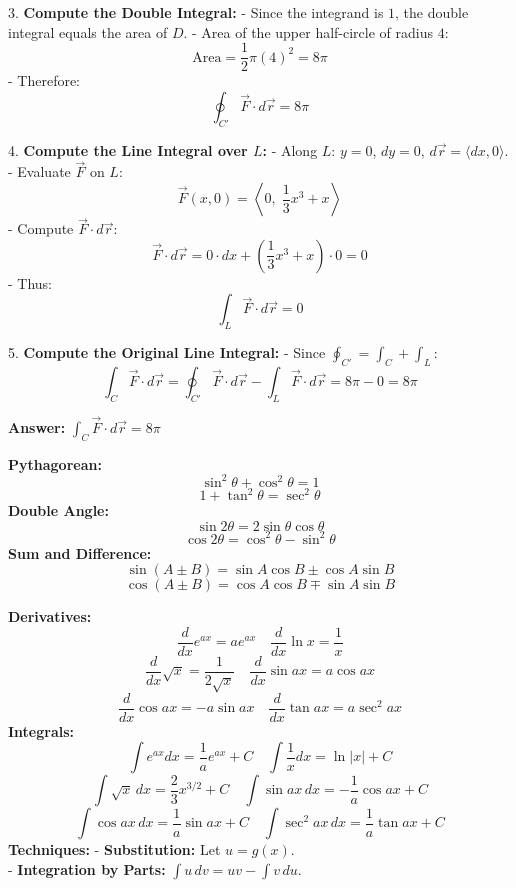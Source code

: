 \documentclass[9pt]{article}
\begin{document}
\begin{multicols}{2}
\begin{tcolorbox}[title=\textbf{Example: Evaluating a Line Integral Using Green's Theorem}, colframe=lightpink]
   3. \textbf{Compute the Double Integral:}
      - Since the integrand is \( 1 \), the double integral equals the area of \( D \).
      - Area of the upper half-circle of radius \( 4 \):
        \[ \text{Area} = \dfrac{1}{2} \pi (4)^2 = 8\pi \]
      - Therefore:
        \[ \oint_{C'} \vec{F} \cdot d\vec{r} = 8\pi \]
   
   4. \textbf{Compute the Line Integral over \( L \):}
      - Along \( L \): \( y = 0 \), \( dy = 0 \), \( d\vec{r} = \langle dx, 0 \rangle \).
      - Evaluate \( \vec{F} \) on \( L \):
        \[ \vec{F}(x, 0) = \left\langle 0,\; \dfrac{1}{3} x^3 + x \right\rangle \]
      - Compute \( \vec{F} \cdot d\vec{r} \):
        \[ \vec{F} \cdot d\vec{r} = 0 \cdot dx + \left( \dfrac{1}{3} x^3 + x \right) \cdot 0 = 0 \]
      - Thus:
        \[ \int_L \vec{F} \cdot d\vec{r} = 0 \]
   
   5. \textbf{Compute the Original Line Integral:}
      - Since \( \oint_{C'} = \int_C + \int_L \):
        \[ \int_C \vec{F} \cdot d\vec{r} = \oint_{C'} \vec{F} \cdot d\vec{r} - \int_L \vec{F} \cdot d\vec{r} = 8\pi - 0 = 8\pi \]
   
   \textbf{Answer:} \( \displaystyle \int_C \vec{F} \cdot d\vec{r} = 8\pi \)
   \end{tcolorbox}

\begin{tcolorbox}[title=\textbf{Trigonometric Identities}, colframe=lightpink]
\textbf{Pythagorean:}
\[ \sin^2 \theta + \cos^2 \theta = 1 \]
\[ 1 + \tan^2 \theta = \sec^2 \theta \]
\textbf{Double Angle:}
\[ \sin 2\theta = 2 \sin \theta \cos \theta \]
\[ \cos 2\theta = \cos^2 \theta - \sin^2 \theta \]
\textbf{Sum and Difference:}
\[ \sin (A \pm B) = \sin A \cos B \pm \cos A \sin B \]
\[ \cos (A \pm B) = \cos A \cos B \mp \sin A \sin B \]
\end{tcolorbox}

\begin{tcolorbox}[title=\textbf{Common Derivatives and Integrals}, colframe=lightyellow]
\textbf{Derivatives:}
\[ \frac{d}{dx} e^{ax} = a e^{ax} \quad \frac{d}{dx} \ln x = \frac{1}{x} \]
\[ \frac{d}{dx} \sqrt{x} = \frac{1}{2 \sqrt{x}} \quad \frac{d}{dx} \sin ax = a \cos ax \]
\[ \frac{d}{dx} \cos ax = -a \sin ax \quad \frac{d}{dx} \tan ax = a \sec^2 ax \]
\textbf{Integrals:}
\[ \int e^{ax} dx = \frac{1}{a} e^{ax} + C \quad \int \frac{1}{x} dx = \ln |x| + C \]
\[ \int \sqrt{x}\, dx = \frac{2}{3} x^{3/2} + C \quad \int \sin ax\, dx = -\frac{1}{a} \cos ax + C \]
\[ \int \cos ax\, dx = \frac{1}{a} \sin ax + C \quad  \int \sec^2 ax\, dx = \frac{1}{a} \tan ax + C \]
\textbf{Techniques:}
- \textbf{Substitution:} Let \( u = g(x) \). \\
- \textbf{Integration by Parts:} \( \int u\, dv = uv - \int v\, du \).
\end{tcolorbox}


\end{multicols}
\end{document}
